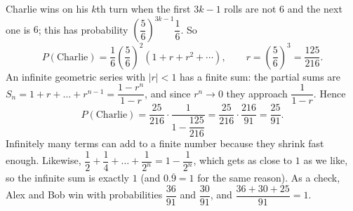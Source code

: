 Charlie wins on his $k$th turn when the first $3k-1$ rolls are not $6$ and the next one is $6$; this has probability $\left(\dfrac{5}{6}\right)^{3k-1}\dfrac{1}{6}$. So
\[
P(\text{Charlie})=\dfrac{1}{6}\left(\dfrac{5}{6}\right)^{2}\left(1+r+r^2+\cdots\right),\qquad r=\left(\dfrac{5}{6}\right)^3=\dfrac{125}{216}.
\]
An infinite geometric series with $|r|<1$ has a finite sum: the partial sums are $S_n=1+r+\dots+r^{n-1}=\dfrac{1-r^n}{1-r}$, and since $r^n\to0$ they approach $\dfrac{1}{1-r}$. Hence
\[
P(\text{Charlie})=\dfrac{25}{216}\cdot\dfrac{1}{1-\dfrac{125}{216}}=\dfrac{25}{216}\cdot\dfrac{216}{91}=\boxed{\dfrac{25}{91}} .
\]
Infinitely many terms can add to a finite number because they shrink fast enough. Likewise, $\dfrac{1}{2}+\dfrac{1}{4}+\dots+\dfrac{1}{2^n}=1-\dfrac{1}{2^n}$, which gets as close to $1$ as we like, so the infinite sum is exactly $1$ (and $0.\overline{9}=1$ for the same reason). As a check, Alex and Bob win with probabilities $\dfrac{36}{91}$ and $\dfrac{30}{91}$, and $\dfrac{36+30+25}{91}=1$.
